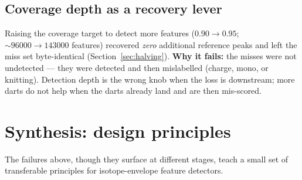 \documentclass[11pt]{article}
\begin{document}
\subsection{Coverage depth as a recovery lever}
\label{sec:neg-coverage}
Raising the coverage target to detect more features ($0.90 \rightarrow 0.95$;
$\sim\!\num{96000} \rightarrow \num{143000}$ features) recovered \emph{zero} additional reference
peaks and left the miss set byte-identical (Section~\ref{sec:halving}). \textbf{Why it fails:} the
misses were not undetected --- they were detected and then mislabelled (charge, mono, or knitting).
Detection depth is the wrong knob when the loss is downstream; more darts do not help when the
darts already land and are then mis-scored.

\section{Synthesis: design principles}
\label{sec:synthesis}

The failures above, though they surface at different stages, teach a small set of transferable
principles for isotope-envelope feature detectors.
\end{document}
